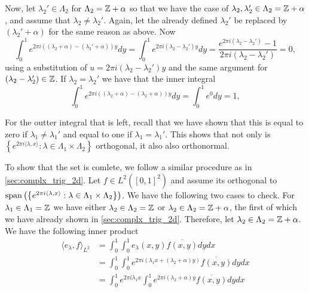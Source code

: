 \documentclass[../thesis.tex]{subfiles}
\begin{document}

Now, let $\lambda_2'\in \Lambda_2$ for $\Lambda_2=\mathbb{Z}+\alpha$ so that we have the case of $\lambda_2,\lambda_2'\in \Lambda_2= \mathbb{Z}+\alpha$, and assume that $\lambda_2\neq\lambda_2'$. Again, let the already defined $\lambda_2'$ be replaced by $(\lambda_2'+\alpha)$ for the same reason as above. Now
\begin{equation*}
    \int_0^1  e^{2\pi i ((\lambda_2+\alpha) - (\lambda_2'+\alpha))y} dy = \int_0^1 e^{2\pi i  (\lambda_2 - \lambda_2')y} dy = \frac{e^{2\pi i (\lambda_2- \lambda_2')}-1}{2\pi i (\lambda_2- \lambda_2')} =0,
\end{equation*}
using a substitution of $u=2\pi i (\lambda_2-\lambda_2')y$ and the same argument for $(\lambda_2-\lambda_2') \in \mathbb{Z}$. If $\lambda_2 = \lambda_2'$ we have that the inner integral
\begin{equation*}
    \int_0^1  e^{2\pi i  ((\lambda_2+\alpha) - (\lambda_2+\alpha))y} dy =  \int_0^1 e^0 dy = 1,
\end{equation*}

For the outter integral that is left, recall that we have shown that this is equal to zero if $\lambda_1\neq\lambda_1'$ and equal to one if $\lambda_1 = \lambda_1'$. This shows that not only is $\left\{ e^{2\pi i \langle \lambda,x  \rangle } : \lambda \in \Lambda_1\times\Lambda_2\right\}$ orthogonal, it also also orthonormal. 


To show that the set is comlete, we follow a similar procedure as in \cref{sec:complx_trig_2d}. Let $f\in L^2([0,1]^2)$ and assume its orthogonal to $\operatorname{span}\left( \left\{ e^{2\pi i \langle \lambda,x  \rangle } : \lambda \in \Lambda_1\times\Lambda_2\right\} \right)$. We have the following two cases to check. For $\lambda_1\in\Lambda_1=\mathbb{Z}$ we have either $\lambda_2\in \Lambda_2=\mathbb{Z}$ or $\lambda_2\in \Lambda_2=\mathbb{Z}+\alpha$, the first of which we have already shown in \cref{sec:complx_trig_2d}. Therefore, let $\lambda_2\in \Lambda_2=\mathbb{Z}+\alpha$. We have the following inner product
\begin{align*}
    \langle e_\lambda, f \rangle_{L^2} 
    &= \int_0^1 \int_0^1 e_\lambda(x,y) \overline{f(x,y)} dydx \\   &= \int_0^1 \int_0^1 e^{2\pi i  (\lambda_1x + (\lambda_2+\alpha) y)} \overline{f(x,y)} dydx \\
    &= \int_0^1 e^{2 \pi i \lambda_1 x}\int_0^1 e^{2 \pi i (\lambda_2+\alpha) y} \overline{f(x,y)} dydx \\
\end{align*}
\end{document}
